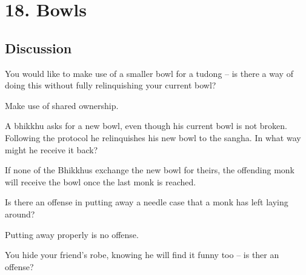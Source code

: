 \chapter{18. Bowls}
\renewcommand*{\theChapterTitle}{18. Bowls}

\section*{Discussion}


You would like to make use of a smaller bowl for a tudong – is there a way of
doing this without fully relinquishing your current bowl?

\begin{solution}
  Make use of shared ownership.
\end{solution}

  \bigskip


A bhikkhu asks for a new bowl, even though his current bowl is not broken.
Following the protocol he relinquishes his new bowl to the sangha. In what way
might he receive it back?

\begin{solution}
  If none of the Bhikkhus exchange the new bowl for theirs, the offending
  monk will receive the bowl once the last monk is reached.
\end{solution}

\bigskip


Is there an offense in putting away a needle case that a monk has left laying around? 

\begin{solution}
  Putting away properly is no offense.
\end{solution}

\bigskip

You hide your friend's robe, knowing he will find it funny too – is ther an offense?

